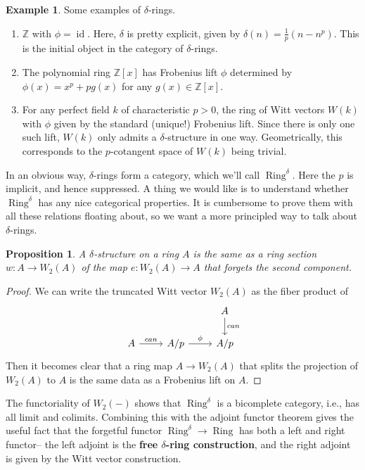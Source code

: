 \documentclass[12pt]{amsproc}
\newtheorem*{prop}{Proposition}
\theoremstyle{definition}
\newtheorem*{example}{Example}
\newcommand{\Z}{\mathbb{Z}}
\newcommand{\ra}{\rightarrow}
\DeclareMathOperator{\id}{id}
\DeclareMathOperator{\Ring}{Ring}
\begin{document}
\begin{example} 
Some examples of $\delta$-rings.

\begin{enumerate}
\item $\Z$ with $\phi=\id$. Here, $\delta$ is pretty explicit, given by $\delta(n)=\frac{1}{p}(n-n^p)$. This is the initial object in the category of $\delta$-rings.
\item The polynomial ring $\Z[x]$ has Frobenius lift $\phi$ determined by $\phi(x)=x^p + pg(x)$ for any $g(x)\in \Z[x]$.
\item For any perfect field $k$ of characteristic $p>0$, the ring of Witt vectors $W(k)$ with $\phi$ given by the standard (unique!) Frobenius lift. Since there is only one such lift, $W(k)$ only admits a $\delta$-structure in one way. Geometrically, this corresponds to the $p$-cotangent space of $W(k)$ being trivial.
\end{enumerate}
\end{example}

In an obvious way, $\delta$-rings form a category, which we'll call $\Ring^\delta$. Here the $p$ is implicit, and hence suppressed. A thing we would like is to understand whether $\Ring^\delta$ has any nice categorical properties. It is cumbersome to prove them with all these relations floating about, so we want a more principled way to talk about $\delta$-rings.

\begin{prop} A $\delta$-structure on a ring $A$ is the same as a ring section $w:A\ra W_2(A)$ of the map $e:W_2(A)\ra A$ that forgets the second component.
\end{prop}
\begin{proof}
We can write the truncated Witt vector $W_2(A)$ as the fiber product of
\[\begin{tikzcd}
&&A\arrow[d, "can"]\\
A\arrow[r, "can"]&A/p\arrow[r, "\phi"]& A/p
\end{tikzcd}\]
Then it becomes clear that a ring map $A\ra W_2(A)$ that splits the projection of $W_2(A)$ to $A$ is the same data as a Frobenius lift on $A$.
\end{proof}

The functoriality of $W_2(-)$ shows that $\Ring^\delta$ is a bicomplete category, i.e., has all limit and colimits. Combining this with the adjoint functor theorem gives the useful fact that the forgetful functor $\Ring^\delta\ra \Ring$ has both a left and right functor-- the left adjoint is the \textbf{free $\delta$-ring construction}, and the right adjoint is given by the Witt vector construction.
\end{document}
